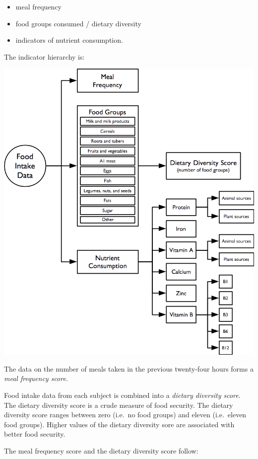 \documentclass[12pt,a4paper]{book}
\providecommand{\tightlist}{%
  \setlength{\itemsep}{0pt}\setlength{\parskip}{0pt}}
\theoremstyle{definition}
\theoremstyle{definition}
\theoremstyle{definition}
\theoremstyle{remark}
\begin{document}
\begin{itemize}
\tightlist
\item
  meal frequency
\item
  food groups consumed / dietary diversity
\item
  indicators of nutrient consumption.
\end{itemize}

The indicator hierarchy is:

\begin{center}\includegraphics{figures/indicators04} \end{center}

The data on the number of meals taken in the previous twenty-four hours
forms a \emph{meal frequency score}.

Food intake data from each subject is combined into a \emph{dietary
diversity score}. The dietary diversity score is a crude measure of food
security. The dietary diversity score ranges between zero (i.e.~no food
groups) and eleven (i.e.~eleven food groups). Higher values of the
dietary diversity sore are associated with better food security.

The meal frequency score and the dietary diversity score follow:
\end{document}
